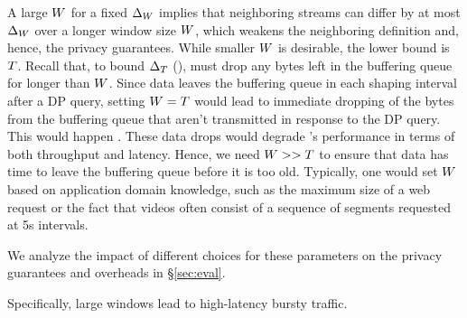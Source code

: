 A large $W$ for a fixed $\Delta_{W}$ implies that
neighboring streams can differ by at most $\Delta_{W}$ over a longer window size
$W$, which weakens the neighboring definition and, hence, the privacy
guarantees.
While smaller $W$ is desirable, the lower bound is $T$.
Recall that, to bound $\Delta_T$ (),
{\sys} must drop any bytes left in the buffering queue for longer than $W$.
Since data leaves the buffering queue in each shaping interval after a
DP query, setting $W = T$ would lead to immediate dropping of the
bytes from the buffering queue that aren't transmitted in response to the
DP query. This would happen .
These data drops would degrade {\sys}'s performance in terms of both
throughput and latency. Hence, we need $W >> T$ to ensure that data
has time to leave the buffering queue before it is too old.
Typically, one would set $W$ based on application domain knowledge, such
as the maximum size of a web request or the fact that videos often consist of a
sequence of segments requested at 5s intervals.

We analyze the impact of different choices for these parameters on
the privacy guarantees and overheads in \S\ref{sec:eval}.




Specifically, large windows lead to high-latency bursty traffic.

